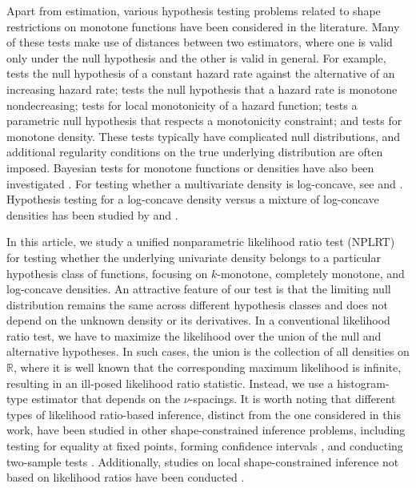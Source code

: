 \documentclass[12pt,letterpaper, twoside, openany]{article}
\theoremstyle{plain}
\begin{document}
Apart from estimation, various hypothesis testing problems related to shape restrictions on monotone functions have been considered in the literature. Many of these tests make use of distances between two estimators, where one is valid only under the null hypothesis and the other is valid in general.  For example, \cite{proschan1967tests} tests the null hypothesis of a constant hazard rate against the alternative of an increasing hazard rate; \cite{hall2005testing} tests the null hypothesis that a hazard rate is monotone nondecreasing;   \cite{groeneboom2012isotonic} tests for local monotonicity of a hazard function;
\cite{durot2010goodness} tests a parametric null hypothesis that respects a monotonicity constraint; and \cite{kulikov2004testing} tests for monotone density.
These tests typically have complicated null distributions, and additional regularity conditions on the true underlying distribution are often imposed. Bayesian tests for monotone functions or densities have also been investigated \citep{salomond2018testing, chakraborty2021convergence, chakraborty2022rates}.
For testing whether a multivariate density is log-concave, see \cite{chen2013smoothed} and \cite{dunn2021universal}. Hypothesis testing for a log-concave density versus a mixture of log-concave densities has been studied by \cite{walther2002detecting} and \cite{balabdaoui2018inference}.

In this article, we study a unified nonparametric likelihood ratio test (NPLRT) for testing whether the underlying univariate density belongs to a particular hypothesis class of functions, focusing on $k$-monotone, completely monotone, and log-concave densities. An attractive feature of our test is that the limiting null distribution remains the same across different hypothesis classes and does not depend on the unknown density or its derivatives.   In a conventional likelihood ratio test, we have to maximize the likelihood over the union of the null and alternative hypotheses. In such cases, the union is the collection of all densities on $\mathbb{R}$, where it is well known that the corresponding maximum likelihood is infinite, resulting in an ill-posed likelihood ratio statistic. 
Instead, we use a histogram-type estimator that depends on the $\nu$-spacings. It is worth noting that different types of likelihood ratio-based inference, distinct from the one considered in this work, have been studied in other shape-constrained inference problems, including testing for equality at fixed points, forming confidence intervals \citep{banerjee2001likelihood, banerjee2005likelihood, banerjee2007likelihood, nane2015likelihood, groeneboom2015nonparametric, doss2019inference, doss2019concave}, and conducting two-sample tests \citep{groeneboom2012likelihood}. Additionally, studies on local shape-constrained inference not based on likelihood ratios have been conducted \citep{deng2021confidence, deng2023inference}.
\end{document}
